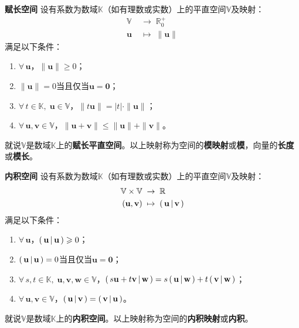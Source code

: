 \documentclass[12pt,UTF8,fontset=none]{ctexbook}
\begin{document}
\begin{appendix}
\begin{df}{\textbf{赋长空间}}
    设有系数为数域$\mathbb{K}$（如有理数或实数）上的平直空间$\mathbb{V}$及映射：
    \begin{align*}
        \mathbb{V} \;&\rightarrow \;\mathbb{R}_0^+ \\
        \mathbf{u} \;&\mapsto \;\| \mathbf{u} \|
    \end{align*}
    满足以下条件：
    \begin{enumerate}
        \item $\forall \, \mathbf{u}$，$\|\mathbf{u}\| \geqslant 0$；
        \item $\| \mathbf{u} \| = 0$当且仅当$\mathbf{u} = \mathbf{0}$；
        \item $\forall \, t \in \mathbb{K}, \; \mathbf{u}\in \mathbb{V}$，$\| t\mathbf{u}\| = |t|\cdot \|\mathbf{u}\|$；
        \item $\forall \, \mathbf{u}, \mathbf{v} \in \mathbb{V}$，$\|\mathbf{u} + \mathbf{v}\| \leqslant \|\mathbf{u}\| + \|\mathbf{v}\|$。
    \end{enumerate}
    就说$\mathbb{V}$是数域$\mathbb{K}$上的\textbf{赋长平直空间}。以上映射称为空间的\textbf{模映射}或\textbf{模}，向量的\textbf{长度}或\textbf{模长}。
\end{df}

\begin{df}{\textbf{内积空间}}
    设有系数为数域$\mathbb{K}$（如有理数或实数）上的平直空间$\mathbb{V}$及映射：
    \begin{align*}
        \mathbb{V}\times \mathbb{V} \;&\rightarrow \;\mathbb{R} \\
        (\mathbf{u}, \mathbf{v}) \;&\mapsto \; \displaystyle\left( \,\mathbf{u} \,\middle\vert \,\mathbf{v} \,\right)
    \end{align*}
    满足以下条件：
    \begin{enumerate}
        \item $\forall \, \mathbf{u}$，$\displaystyle\left( \,\mathbf{u} \,\middle\vert \,\mathbf{u} \,\right) \geqslant 0$；
        \item $\displaystyle\left( \,\mathbf{u} \,\middle\vert \,\mathbf{u} \,\right) = 0$当且仅当$\mathbf{u} = \mathbf{0}$；
        \item $\forall \, s, t \in \mathbb{K}, \; \mathbf{u}, \mathbf{v}, \mathbf{w}\in \mathbb{V}$，$\displaystyle\left( \,s\mathbf{u} + t\mathbf{v} \,\middle\vert \,\mathbf{w} \,\right) = s\displaystyle\left( \,\mathbf{u} \,\middle\vert \,\mathbf{w} \,\right) + t\displaystyle\left( \,\mathbf{v} \,\middle\vert \,\mathbf{w} \,\right)$；
        \item $\forall \, \mathbf{u}, \mathbf{v} \in \mathbb{V}$，$\displaystyle\left( \,\mathbf{u} \,\middle\vert \,\mathbf{v} \,\right) = \displaystyle\left( \,\mathbf{v} \,\middle\vert \,\mathbf{u} \,\right)$。
    \end{enumerate}
    就说$\mathbb{V}$是数域$\mathbb{K}$上的\textbf{内积空间}。以上映射称为空间的\textbf{内积映射}或\textbf{内积}。
\end{df}


\end{appendix}
\end{document}
